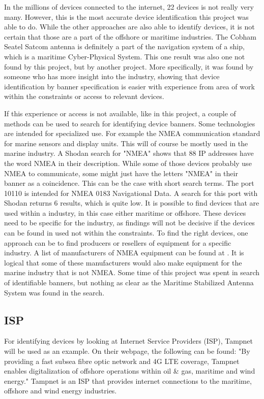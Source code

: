 In the millions of devices connected to the internet, 22 devices is not really very many. However, this is the most accurate device identification this project was able to do. While the other approaches are also able to identify devices, it is not certain that those are a part of the offshore or maritime industries. The Cobham Seatel Satcom antenna is definitely a part of the navigation system of a ship, which is a maritime Cyber-Physical System. This one result was also one not found by this project, but by another project. More specifically, it was found by someone who has more insight into the industry, showing that device identification by banner specification is easier with experience from area of work within the constraints or access to relevant devices.

If this experience or access is not available, like in this project, a couple of methods can be used to search for identifying device banners. 
Some technologies are intended for specialized use. For example the NMEA communication standard for marine sensors and display units. \cite{NMEA} This will of course be mostly used in the marine industry. A Shodan search for "NMEA" shows that 88 IP addresses have the word NMEA in their description. While some of those devices probably use NMEA to communicate, some might just have the letters "NMEA" in their banner as a coincidence. This can be the case with short search terms. The port 10110 is intended for NMEA 0183 Navigational Data. \cite{www_ports} A search for this port with Shodan returns 6 results, which is quite low. 
It is possible to find devices that are used within a industry, in this case either maritime or offshore. These devices need to be specific for the industry, as findings will not be decisive if the devices can be found in used not within the constraints. To find the right devices, one approach can be to find producers or resellers of equipment for a specific industry. A list of manufacturers of NMEA equipment can be found at \cite{NMEA}. It is logical that some of these manufacturers would also make equipment for the marine industry that is not NMEA. 
Some time of this project was spent in search of identifiable banners, but nothing as clear as the Maritime Stabilized Antenna System was found in the search. 


\subsection{ISP}
For identifying devices by looking at Internet Service Providers (ISP), Tampnet will be used as an example. On their webpage, the following can be found: "By providing a fast subsea fibre optic network and 4G LTE coverage, Tampnet enables digitalization of offshore operations within oil \& gas, maritime and wind energy." \cite{tampnet} Tampnet is an ISP that provides internet connections to the maritime, offshore and wind energy industries. 

